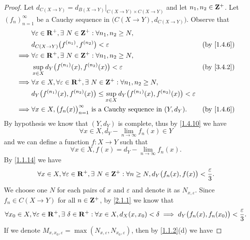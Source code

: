 \begin{proof}
  Let \(d_{C(X \to Y)} = d_{B(X \to Y)}|_{C(X \to Y) \times C(X \to Y)}\) and let \(n_1, n_2 \in \mathbf{Z}^+\).
  Let \((f_n)_{n = 1}^\infty\) be a Cauchy sequence in \(\big(C(X \to Y), d_{C(X \to Y)}\big)\).
  Observe that
  \begin{align*}
             & \forall \varepsilon \in \R^+, \exists\ N \in \Z^+ : \forall n_1, n_2 \geq N,                                                                 \\
             & d_{C(X \to Y)}\big(f^{(n_1)}, f^{(n_2)}\big) < \varepsilon                                                        & \text{(by \cref{1.4.6})} \\
    \implies & \forall \varepsilon \in \R^+, \exists\ N \in \Z^+ : \forall n_1, n_2 \geq N,                                                                 \\
             & \sup_{x \in X} d_Y\big(f^{(n_1)}(x), f^{(n_2)}(x)\big) < \varepsilon                                              & \text{(by \cref{3.4.2})} \\
    \implies & \forall x \in X, \forall \varepsilon \in \R^+, \exists\ N \in \Z^+ : \forall n_1, n_2 \geq N,                                                \\
             & d_Y\big(f^{(n_1)}(x), f^{(n_2)}(x)\big) \leq \sup_{x \in X} d_Y\big(f^{(n_1)}(x), f^{(n_2)}(x)\big) < \varepsilon                            \\
    \implies & \forall x \in X, \big(f_n(x)\big)_{n = 1}^\infty \text{ is a Cauchy sequence in } (Y, d_Y).                       & \text{(by \cref{1.4.6})}
  \end{align*}
  By hypothesis we know that \((Y, d_Y)\) is complete, thus by \cref{1.4.10} we have
  \[
    \forall x \in X, d_Y - \lim_{n \to \infty} f_n(x) \in Y
  \]
  and we can define a function \(f : X \to Y\) such that
  \[
    \forall x \in X, f(x) = d_Y - \lim_{n \to \infty} f_n(x).
  \]
  By \cref{1.1.14} we have
  \[
    \forall x \in X, \forall \varepsilon \in \mathbf{R}^+, \exists\ N \in \mathbf{Z}^+ : \forall n \geq N, d_Y\big(f_n(x), f(x)\big) < \frac{\varepsilon}{3}.
  \]
  We choose one \(N\) for each pairs of \(x\) and \(\varepsilon\) and denote it as \(N_{x, \varepsilon}\).
  Since \(f_n \in C(X \to Y)\) for all \(n \in \mathbf{Z}^+\), by \cref{2.1.1} we know that
  \[
    \forall x_0 \in X, \forall \varepsilon \in \mathbf{R}^+, \exists\ \delta \in \mathbf{R}^+ : \forall x \in X, d_X(x, x_0) < \delta \implies d_Y\big(f_n(x), f_n(x_0)\big) < \frac{\varepsilon}{3}.
  \]
  If we denote \(M_{x, x_0, \varepsilon} = \max(N_{x, \varepsilon}, N_{x_0, \varepsilon})\), then by \cref{1.1.2}(d) we have

\end{proof}
